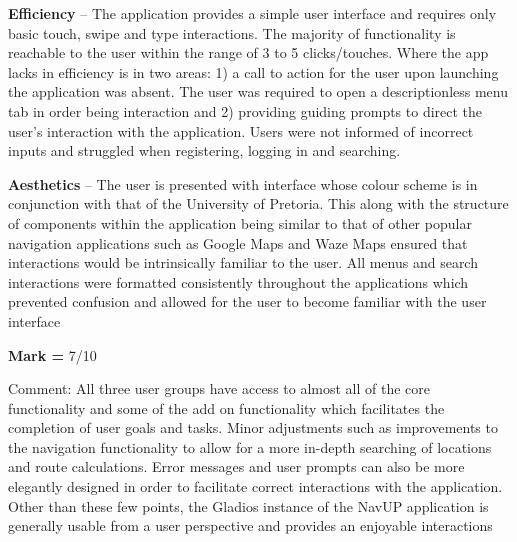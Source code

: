 \documentclass{article}
\begin{document}
		\textbf{Efficiency} – The application provides a simple user interface and requires only basic touch, swipe and type interactions. The majority of functionality is reachable to the user within the range of 3 to 5 clicks/touches. Where the app lacks in efficiency is in two areas:  1) a call to action for the user upon launching the application was absent. The user was required to open a descriptionless menu tab in order being interaction and 2) providing guiding prompts to direct the user’s interaction with the application. Users were not informed of incorrect inputs and struggled when registering, logging in and searching.\newline
		
		\textbf{Aesthetics} – The user is presented with interface whose colour scheme is in conjunction with that of the University of Pretoria. This along with the structure of components within the application being similar to that of other popular navigation applications such as Google Maps and Waze Maps ensured that interactions would be intrinsically familiar to the user. All menus and search interactions were formatted consistently throughout the applications which prevented confusion and allowed for the user to become familiar with the user interface \newline
		
	\textbf{Mark =} 7/10 \newline
	
		Comment:  All three user groups have access to almost all of the core functionality and some of the add on functionality which facilitates the completion of user goals and tasks. Minor adjustments such as improvements to the navigation functionality to allow for a more in-depth searching of locations and route calculations. Error messages and user prompts can also be more elegantly designed in order to facilitate correct interactions with the application. Other than these few points, the Gladios instance of the NavUP application is generally usable from a user perspective and provides an enjoyable interactions 
\end{document}

